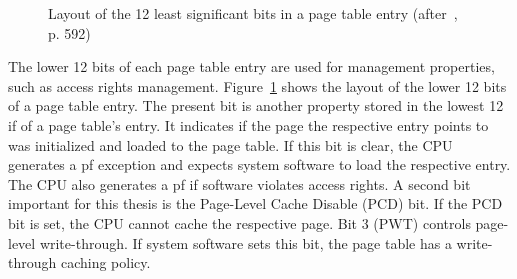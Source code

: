 
\begin{figure}
  \begin{center}
    
    \caption{Layout of the 12 least significant bits in a page table entry (after~\cite{amd_manual}, p. 592)}
    \label{fig:state:technical:paging_rights}
  \end{center}
\end{figure}
The lower 12 bits of each page table entry are used for management properties,
such as access rights management. Figure~\ref{fig:state:technical:paging_rights}
shows the layout of the lower 12 bits of a page table entry. The present bit is
another property stored in the lowest 12 if of a page table's entry. It
indicates if the page the respective entry points to was initialized and loaded
to the page table. If this bit is clear, the CPU generates a \gls{pf} exception
and expects system software to load the respective entry. The CPU also generates
a \gls{pf} if software violates access rights. A second bit important for this
thesis is the Page-Level Cache Disable (PCD) bit. If the PCD bit is set, the CPU
cannot cache the respective page. Bit 3 (PWT) controls page-level write-through.
If system software sets this bit, the page table has a write-through caching
policy.
